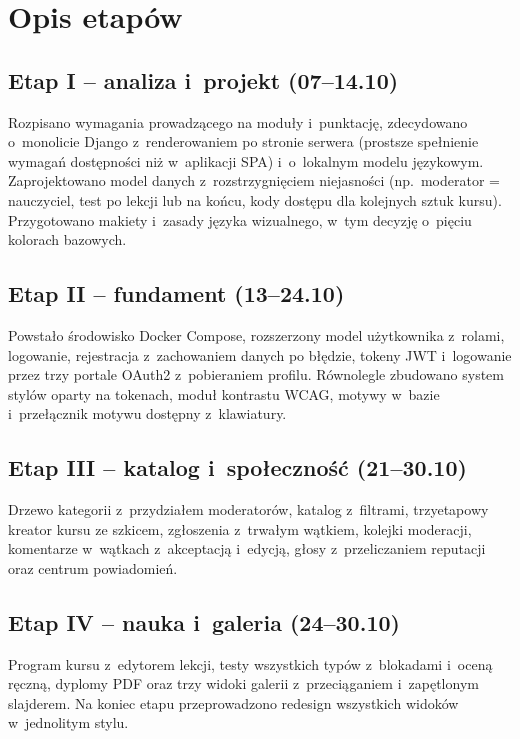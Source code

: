 \section{Opis etapów}

\subsection*{Etap I -- analiza i~projekt (07--14.10)}
Rozpisano wymagania prowadzącego na moduły i~punktację, zdecydowano o~monolicie Django
z~renderowaniem po stronie serwera (prostsze spełnienie wymagań dostępności niż w~aplikacji
SPA) i~o~lokalnym modelu językowym. Zaprojektowano model danych z~rozstrzygnięciem
niejasności (np.\ moderator = nauczyciel, test po lekcji lub na końcu, kody dostępu dla
kolejnych sztuk kursu). Przygotowano makiety i~zasady języka wizualnego, w~tym decyzję
o~pięciu kolorach bazowych.

\subsection*{Etap II -- fundament (13--24.10)}
Powstało środowisko Docker Compose, rozszerzony model użytkownika z~rolami, logowanie,
rejestracja z~zachowaniem danych po błędzie, tokeny JWT i~logowanie przez trzy portale
OAuth2 z~pobieraniem profilu. Równolegle zbudowano system stylów oparty na tokenach,
moduł kontrastu WCAG, motywy w~bazie i~przełącznik motywu dostępny z~klawiatury.

\subsection*{Etap III -- katalog i~społeczność (21--30.10)}
Drzewo kategorii z~przydziałem moderatorów, katalog z~filtrami, trzyetapowy kreator
kursu ze szkicem, zgłoszenia z~trwałym wątkiem, kolejki moderacji, komentarze w~wątkach
z~akceptacją i~edycją, głosy z~przeliczaniem reputacji oraz centrum powiadomień.

\subsection*{Etap IV -- nauka i~galeria (24--30.10)}
Program kursu z~edytorem lekcji, testy wszystkich typów z~blokadami i~oceną ręczną,
dyplomy PDF oraz trzy widoki galerii z~przeciąganiem i~zapętlonym slajderem. Na koniec etapu przeprowadzono redesign wszystkich widoków
w~jednolitym stylu.

